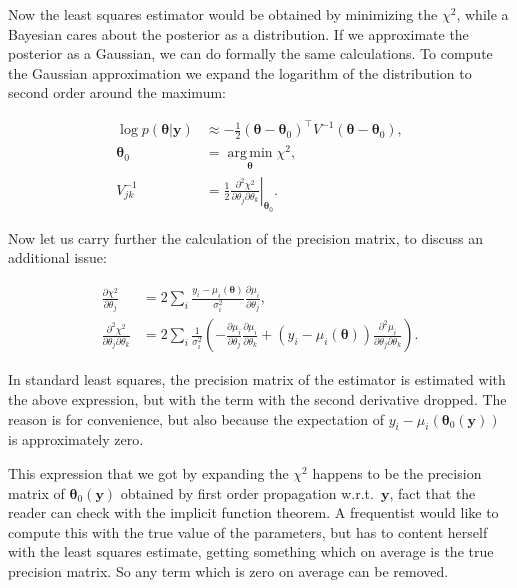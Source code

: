 Now the least squares estimator would be obtained by minimizing the $\chi^2$,
while a Bayesian cares about the posterior as a distribution. If we approximate
the posterior as a Gaussian, we can do formally the same calculations. To
compute the Gaussian approximation we expand the logarithm of the distribution
to second order around the maximum:

\begin{align}
    \log p(\boldsymbol\theta|\mathbf y) &\approx
    -\frac 12 (\boldsymbol\theta-\boldsymbol\theta_0)^\top
    V^{-1} (\boldsymbol\theta-\boldsymbol\theta_0), \\
    \boldsymbol\theta_0
    &= \operatorname*{arg\,min}_{\boldsymbol\theta} \chi^2, \\
    V^{-1}_{jk} &= \frac12 \left.
    \frac {\partial^2 \chi^2} {\partial\theta_j \partial\theta_k}
    \right|_{\boldsymbol\theta_0}. \label{eq:lsqpm}
\end{align}

Now let us carry further the calculation of the precision matrix, to discuss
an additional issue:

\begin{align}
    \frac{\partial\chi^2}{\partial\theta_j} &=
    2 \sum_i \frac {y_i - \mu_i(\boldsymbol\theta)} {\sigma_i^2}
    \frac {\partial\mu_i} {\partial\theta_j}, \\
    \frac {\partial^2 \chi^2} {\partial\theta_j \partial\theta_k} &=
    2 \sum_i \frac1{\sigma_i^2} \left(
    -\frac {\partial\mu_i} {\partial\theta_j}
    \frac {\partial\mu_i} {\partial\theta_k}
    + (y_i - \mu_i(\boldsymbol\theta))
    \frac {\partial^2 \mu_i} {\partial\theta_j \partial\theta_k}
    \right). \label{eq:lsqhess}
\end{align}

In standard least squares, the precision matrix of the estimator is estimated
with the above expression, but with the term with the second derivative
dropped. The reason is for convenience, but also because the expectation of
$y_i - \mu_i(\boldsymbol\theta_0(\mathbf y))$ is approximately zero.

This expression that we got by expanding the $\chi^2$ happens to be the
precision matrix of $\boldsymbol\theta_0(\mathbf y)$ obtained by first order
propagation w.r.t.~$\mathbf y$, fact that the reader can check with the
implicit function theorem. A frequentist would like to compute this with the
true value of the parameters, but has to content herself with the least squares
estimate, getting something which on average is the true precision matrix. So
any term which is zero on average can be removed.


